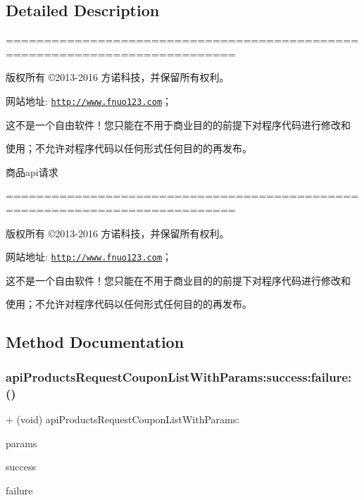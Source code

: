 \subsection{Detailed Description}
============================================================================

版权所有 ©2013-\/2016 方诺科技，并保留所有权利。

网站地址\+: \href{http://www.fnuo123.com}{\tt http\+://www.\+fnuo123.\+com}； 



这不是一个自由软件！您只能在不用于商业目的的前提下对程序代码进行修改和

使用；不允许对程序代码以任何形式任何目的的再发布。 



商品api请求

============================================================================

版权所有 ©2013-\/2016 方诺科技，并保留所有权利。

网站地址\+: \href{http://www.fnuo123.com}{\tt http\+://www.\+fnuo123.\+com}； 



这不是一个自由软件！您只能在不用于商业目的的前提下对程序代码进行修改和

使用；不允许对程序代码以任何形式任何目的的再发布。 

 

\subsection{Method Documentation}
\mbox{\label{interface_f_n_a_p_i_products_tool_ab3dc486c76f34e2a98e07265eb0be799}} 
\subsubsection{\texorpdfstring{api\+Products\+Request\+Coupon\+List\+With\+Params\+:success\+:failure\+:()}{apiProductsRequestCouponListWithParams:success:failure:()}}
{\footnotesize\ttfamily + (void) api\+Products\+Request\+Coupon\+List\+With\+Params\+: \begin{DoxyParamCaption}\item[{(N\+S\+Mutable\+Dictionary $\ast$)}]{params }\item[{success:(Success\+Request)}]{success }\item[{failure:(Failure\+Request)}]{failure }\end{DoxyParamCaption}}

